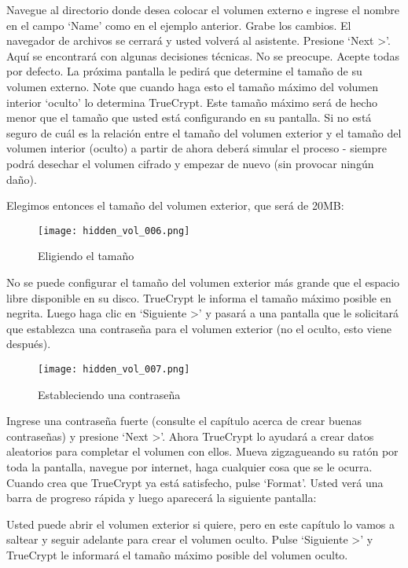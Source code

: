 \documentclass[10pt,a5paper,twoside,,]{book}
\begin{document}
Navegue al directorio donde desea colocar el volumen externo e ingrese
el nombre en el campo `Name' como en el ejemplo anterior. Grabe los
cambios. El navegador de archivos se cerrará y usted volverá al
asistente. Presione `Next \textgreater{}'. Aquí se encontrará con
algunas decisiones técnicas. No se preocupe. Acepte todas por defecto.
La próxima pantalla le pedirá que determine el tamaño de su volumen
externo. Note que cuando haga esto el tamaño máximo del volumen interior
`oculto' lo determina TrueCrypt. Este tamaño máximo será de hecho menor
que el tamaño que usted está configurando en su pantalla. Si no está
seguro de cuál es la relación entre el tamaño del volumen exterior y el
tamaño del volumen interior (oculto) a partir de ahora deberá simular el
proceso - siempre podrá desechar el volumen cifrado y empezar de nuevo
(sin provocar ningún daño).

Elegimos entonces el tamaño del volumen exterior, que será de 20MB:

\begin{figure}[htbp]
\centering
\texttt{[image: hidden\_vol\_006.png]}
\caption{Eligiendo el tamaño}
\end{figure}

No se puede configurar el tamaño del volumen exterior más grande que el
espacio libre disponible en su disco. TrueCrypt le informa el tamaño
máximo posible en negrita. Luego haga clic en `Siguiente \textgreater{}'
y pasará a una pantalla que le solicitará que establezca una contraseña
para el volumen exterior (no el oculto, esto viene después).

\begin{figure}[htbp]
\centering
\texttt{[image: hidden\_vol\_007.png]}
\caption{Estableciendo una contraseña}
\end{figure}

Ingrese una contraseña fuerte (consulte el capítulo acerca de crear
buenas contraseñas) y presione `Next \textgreater{}'. Ahora TrueCrypt lo
ayudará a crear datos aleatorios para completar el volumen con ellos.
Mueva zigzagueando su ratón por toda la pantalla, navegue por internet,
haga cualquier cosa que se le ocurra. Cuando crea que TrueCrypt ya está
satisfecho, pulse `Format'. Usted verá una barra de progreso rápida y
luego aparecerá la siguiente pantalla:

Usted puede abrir el volumen exterior si quiere, pero en este capítulo
lo vamos a saltear y seguir adelante para crear el volumen oculto. Pulse
`Siguiente \textgreater{}' y TrueCrypt le informará el tamaño máximo
posible del volumen oculto.
\end{document}

